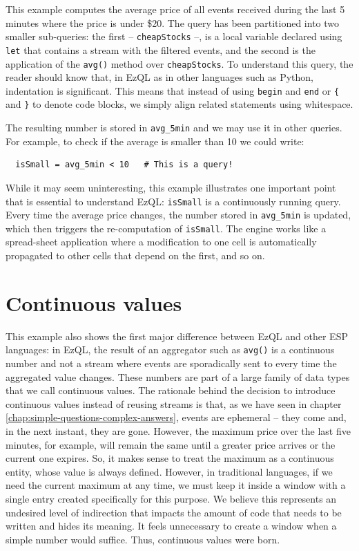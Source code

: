 This example computes the average price of all events received during
the last 5 minutes where the price is under \$20. The query has been
partitioned into two smaller sub-queries: the first --
\verb=cheapStocks= --, is a local variable declared using \verb=let=
that contains a stream with the filtered events, and the second is the
application of the \verb=avg()= method over \verb=cheapStocks=. To
understand this query, the reader should know that, in EzQL as in
other languages such as Python, indentation is significant. This
means that instead of using \verb=begin= and \verb=end= or \verb={=
  and \verb=}= to denote code blocks, we simply align related
statements using whitespace.

The resulting number is stored in \verb=avg_5min= and we may use it in
other queries. For example, to check if the average is smaller than 10
we could write:

\begin{lstlisting}
  isSmall = avg_5min < 10	# This is a query!
\end{lstlisting}

While it may seem uninteresting, this example illustrates one
important point that is essential to understand EzQL: \verb=isSmall=
is a continuously running query. Every time the average price changes,
the number stored in \verb=avg_5min= is updated, which then triggers
the re-computation of \verb=isSmall=. The engine works like a
spread-sheet application where a modification to one cell is
automatically propagated to other cells that depend on the first, and
so on.

\section{Continuous values}
\label{sec:continuous-values}

This example also shows the first major difference between EzQL and
other ESP languages: in EzQL, the result of an aggregator such as
\verb=avg()= is a continuous number and not a stream where events are
sporadically sent to every time the aggregated value changes. These
numbers are part of a large family of data types that we call
continuous values. The rationale behind the decision to introduce
continuous values instead of reusing streams is that, as we have seen
in chapter \ref{chap:simple-questions-complex-answers}, events are
ephemeral -- they come and, in the next instant, they are
gone. However, the maximum price over the last five minutes, for
example, will remain the same until a greater price arrives or the
current one expires. So, it makes sense to treat the maximum as a
continuous entity, whose value is always defined. However, in
traditional languages, if we need the current maximum at any time, we
must keep it inside a window with a single entry created specifically
for this purpose. We believe this represents an undesired level of
indirection that impacts the amount of code that needs to be written
and hides its meaning. It feels unnecessary to create a window when a
simple number would suffice. Thus, continuous values were born.

